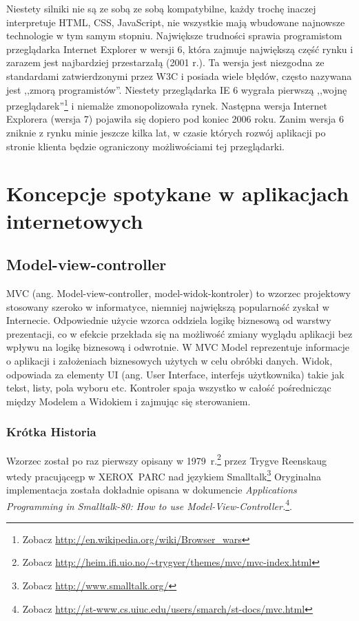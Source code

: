\documentclass[a4paper,12pt,oneside]{report}
\begin{document}
Niestety silniki nie są ze sobą ze sobą kompatybilne, każdy trochę inaczej interpretuje HTML, CSS, JavaScript, nie wszystkie mają wbudowane najnowsze technologie w tym samym stopniu. Największe trudności sprawia programistom przeglądarka Internet Explorer w wersji 6, która zajmuje największą część rynku i zarazem jest najbardziej przestarzałą (2001 r.). Ta wersja jest niezgodna ze standardami zatwierdzonymi przez W3C i posiada wiele błędów, często nazywana jest ,,zmorą programistów''. Niestety przeglądarka IE 6 wygrała pierwszą ,,wojnę przeglądarek''\footnote{Zobacz \url{http://en.wikipedia.org/wiki/Browser_wars}} i niemalże zmonopolizowała rynek. Następna wersja Internet Explorera (wersja 7) pojawiła się dopiero pod koniec 2006 roku. Zanim wersja 6 zniknie z rynku minie jeszcze kilka lat, w czasie których rozwój aplikacji po stronie klienta będzie ograniczony możliwościami tej przeglądarki.

\chapter[Rozwiązania koncepcyjne]{Koncepcje spotykane w aplikacjach internetowych}
\label{cha:koncepcje}

\section{Model-view-controller}
\label{sec:mvc}
MVC (ang. Model-view-controller, model-widok-kontroler) to wzorzec projektowy stosowany szeroko w informatyce, niemniej największą popularność zyskał w Internecie. Odpowiednie użycie wzorca oddziela logikę biznesową od warstwy prezentacji, co w efekcie przekłada się na możliwość zmiany wyglądu aplikacji bez wpływu na logikę biznesową i odwrotnie. W MVC Model reprezentuje informacje o aplikacji i założeniach biznesowych użytych w celu obróbki danych. Widok, odpowiada za elementy UI (ang. User Interface, interfejs użytkownika) takie jak tekst, listy, pola wyboru etc. Kontroler spaja wszystko w całość pośrednicząc między Modelem a Widokiem i zajmując się sterowaniem.

\subsection{Krótka Historia}
\label{subsec:mvc-historia}
Wzorzec został po raz pierwszy opisany w 1979~r.\footnote{Zobacz \url{http://heim.ifi.uio.no/~trygver/themes/mvc/mvc-index.html}} przez Trygve Reenskaug wtedy pracującegp w XEROX~PARC nad językiem Smalltalk\footnote{Zobacz \url{http://www.smalltalk.org/}} Oryginalna implementacja została dokładnie opisana w dokumencie \emph{Applications Programming in Smalltalk-80: How to use Model-View-Controller.}\footnote{Zobacz \url{http://st-www.cs.uiuc.edu/users/smarch/st-docs/mvc.html}}.
\end{document}
